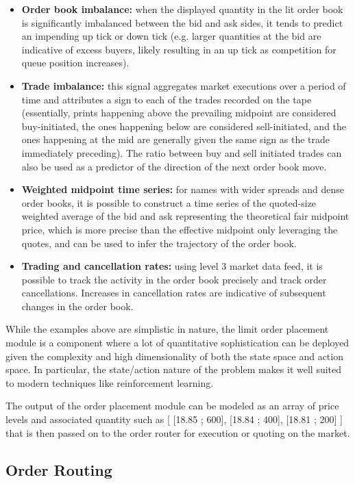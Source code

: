 \begin{itemize}

\item \textbf{Order book imbalance:} when the displayed quantity in the lit order book is significantly imbalanced between the bid and ask sides, it tends to predict an impending up tick or down tick (e.g. larger quantities at the bid are indicative of excess buyers, likely resulting in an up tick as competition for queue position increases).
\item \textbf{Trade imbalance:} this signal aggregates market executions over a period of time and attributes a sign to each of the trades recorded on the tape (essentially, prints happening above the prevailing midpoint are considered buy-initiated, the ones happening below are considered sell-initiated, and the ones happening at the mid are generally given the same sign as the trade immediately preceding). The ratio between buy and sell initiated trades can also be used as a predictor of the direction of the next order book move.
\item \textbf{Weighted midpoint time series:} for names with wider spreads and dense order books, it is possible to construct a time series of the quoted-size weighted average of the bid and ask representing the theoretical fair midpoint price, which is more precise than the effective midpoint only leveraging the quotes, and can be used to infer the trajectory of the order book.
\item \textbf{Trading and cancellation rates:} using level 3 market data feed, it is possible to track the activity in the order book precisely and track order cancellations. Increases in cancellation rates are indicative of subsequent changes in the order book. 
\end{itemize}

While the examples above are simplistic in nature, the limit order placement module is a component where a lot of quantitative sophistication can be deployed given the complexity and high dimensionality of both the state space and action space. In particular, the state/action nature of the problem makes it well suited to modern techniques like reinforcement learning. 

The output of the order placement module can be modeled as an array of price levels and associated quantity such as [ [18.85 ; 600], [18.84 ; 400], [18.81 ; 200] ] that is then passed on to the order router for execution or quoting on the market.

\subsection{Order Routing}

